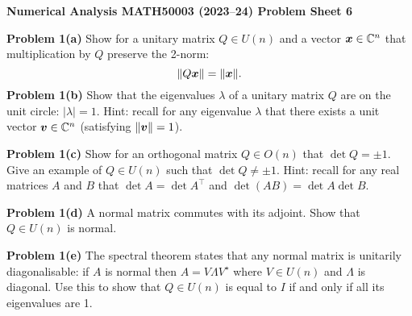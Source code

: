 \documentclass[12pt,a4paper]{article}
\def\endash{–}
\def\bbC{ {\mathbb C} }
\def\x{ {\vc x} }
\def\v{ {\vc v} }
\begin{document}
\textbf{Numerical Analysis MATH50003 (2023\ensuremath{\endash}24) Problem Sheet 6}

\textbf{Problem 1(a)} Show for a unitary matrix $Q \ensuremath{\in} U(n)$ and a vector $\ensuremath{\bm{\x}} \ensuremath{\in} \ensuremath{\bbC}^n$ that multiplication by $Q$ preserve the 2-norm:
\[
\|Q \ensuremath{\bm{\x}}\| = \|\ensuremath{\bm{\x}}\|.
\]
\textbf{Problem 1(b)} Show that the eigenvalues $\ensuremath{\lambda}$ of a unitary matrix $Q$ are on the unit circle: $|\ensuremath{\lambda}| = 1$. Hint: recall for any eigenvalue $\ensuremath{\lambda}$ that there exists a unit vector $\ensuremath{\bm{\v}} \ensuremath{\in} \ensuremath{\bbC}^n$ (satisfying $\| \ensuremath{\bm{\v}} \| = 1$). 

\textbf{Problem 1(c)} Show for an orthogonal matrix $Q \ensuremath{\in} O(n)$ that $\det Q = \ensuremath{\pm}1$. Give an example of $Q \ensuremath{\in} U(n)$ such that $\det Q \ensuremath{\neq} \ensuremath{\pm}1$. Hint: recall for any real matrices $A$ and $B$ that $\det A = \det A^\ensuremath{\top}$ and $\det(AB) = \det A \det B$.

\textbf{Problem 1(d)} A normal matrix commutes with its adjoint. Show that $Q \ensuremath{\in} U(n)$ is normal.

\textbf{Problem 1(e)}  The spectral theorem states that any normal matrix is unitarily diagonalisable: if $A$ is normal then $A = V \ensuremath{\Lambda} V^\ensuremath{\star}$ where $V \ensuremath{\in} U(n)$ and $\ensuremath{\Lambda}$ is diagonal. Use this to show that  $Q \ensuremath{\in} U(n)$ is equal to $I$ if and only if all its eigenvalues are 1.
\end{document}
